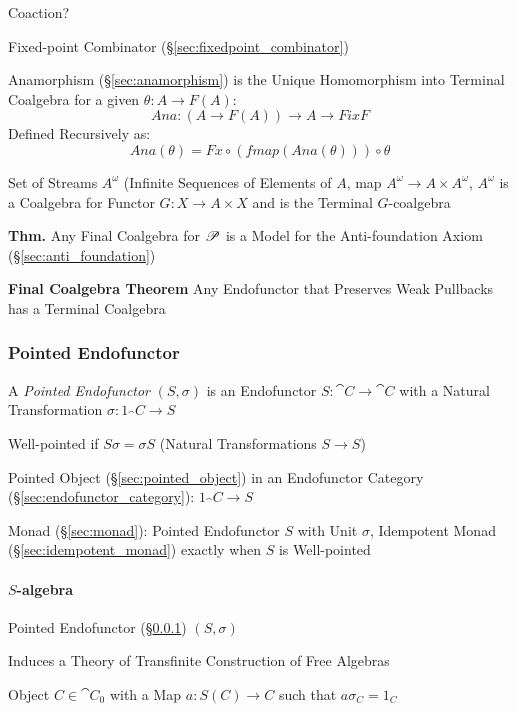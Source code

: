 Coaction?

Fixed-point Combinator (\S\ref{sec:fixedpoint_combinator})

Anamorphism (\S\ref{sec:anamorphism}) is the Unique Homomorphism into
Terminal Coalgebra for a given $\theta : A \rightarrow F(A)$:
\[
  Ana : (A \rightarrow F (A)) \rightarrow A \rightarrow Fix F
\]
Defined Recursively as:
\[
  Ana (\theta) = Fx \circ (fmap (Ana (\theta))) \circ \theta
\]

Set of Streams $A^\omega$ (Infinite Sequences of Elements of $A$, map
$A^\omega \rightarrow A \times A^\omega$, $A^\omega$ is a Coalgebra
for Functor $G : X \rightarrow A \times X$ and is the Terminal
$G$-coalgebra

\textbf{Thm.} Any Final Coalgebra for $\mathscr{P}$ is a Model for the
Anti-foundation Axiom (\S\ref{sec:anti_foundation}) \cite{aczel88}

\textbf{Final Coalgebra Theorem} Any Endofunctor that Preserves Weak
Pullbacks has a Terminal Coalgebra \cite{aczel88}



\subsubsection{Pointed Endofunctor}\label{sec:pointed_endofunctor}

A \emph{Pointed Endofunctor} $(S,\sigma)$ is an Endofunctor $S :
\cat{C} \rightarrow \cat{C}$ with a Natural Transformation $\sigma :
1_\cat{C} \rightarrow S$

Well-pointed if $S \sigma = \sigma S$ (Natural Transformations $S
\rightarrow S$)

Pointed Object (\S\ref{sec:pointed_object}) in an Endofunctor Category
(\S\ref{sec:endofunctor_category}): $1_\cat{C} \rightarrow S$

Monad (\S\ref{sec:monad}): Pointed Endofunctor $S$ with Unit $\sigma$,
Idempotent Monad (\S\ref{sec:idempotent_monad}) exactly when $S$ is
Well-pointed



\paragraph{$S$-algebra}\label{sec:s_algebra}\hfill

Pointed Endofunctor (\S\ref{sec:pointed_endofunctor}) $(S, \sigma)$

Induces a Theory of Transfinite Construction of Free Algebras

Object $C \in \cat{C}_0$ with a Map $a : S(C) \rightarrow C$ such that
$a \sigma_C = 1_C$

